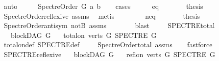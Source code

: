 \begin{isabellebody}
\ auto\isanewline
\ \ \isamarkupfalse%
\ \isamarkupfalse%
\ {\isachardoublequoteopen}Spectre{\isacharunderscore}{\kern0pt}Order\ G\ a\ b{\isachardoublequoteclose}\isanewline
\ \ \isamarkupfalse%
\ {\isacharparenleft}{\kern0pt}cases{\isacharparenright}{\kern0pt}\isanewline
\ \ \ \ \isamarkupfalse%
\ eq\isanewline
\ \ \ \ \isamarkupfalse%
\ \isamarkupfalse%
\ {\isacharquery}{\kern0pt}thesis\ \isamarkupfalse%
\ Spectre{\isacharunderscore}{\kern0pt}Order{\isacharunderscore}{\kern0pt}reflexive\ assms\ \isamarkupfalse%
\ metis\isanewline
\ \ \isamarkupfalse%
\isanewline
\ \ \ \ \isamarkupfalse%
\ neq\isanewline
\ \ \ \ \isamarkupfalse%
\ \isamarkupfalse%
\ {\isachardoublequoteopen}{\isacharquery}{\kern0pt}thesis{\isachardoublequoteclose}\ \isamarkupfalse%
\ Spectre{\isacharunderscore}{\kern0pt}Order{\isacharunderscore}{\kern0pt}antisym\ notB\ assms\isanewline
\ \ \ \ \ \ \isamarkupfalse%
\ blast\ \isanewline
\ \ \isamarkupfalse%
\isanewline
{}\isamarkupfalse%
%
\endisatagproof
{\isafoldproof}%
%
\isadelimproof
\isanewline
%
\endisadelimproof
\isanewline
{}\isamarkupfalse%
\ SPECTRE{\isacharunderscore}{\kern0pt}total{\isacharcolon}{\kern0pt}\isanewline
\ \ \ {\isachardoublequoteopen}blockDAG\ G{\isachardoublequoteclose}\isanewline
\ \ \ {\isachardoublequoteopen}total{\isacharunderscore}{\kern0pt}on\ {\isacharparenleft}{\kern0pt}verts\ G{\isacharparenright}{\kern0pt}\ {\isacharparenleft}{\kern0pt}SPECTRE\ G{\isacharparenright}{\kern0pt}{\isachardoublequoteclose}\isanewline
%
\isadelimproof
\ \ %
\endisadelimproof
%
\isatagproof
{}\isamarkupfalse%
\ total{\isacharunderscore}{\kern0pt}on{\isacharunderscore}{\kern0pt}def\ SPECTRE{\isacharunderscore}{\kern0pt}def\ \isanewline
\ \ \isamarkupfalse%
\ Spectre{\isacharunderscore}{\kern0pt}Order{\isacharunderscore}{\kern0pt}total\ assms\isanewline
\ \ \isamarkupfalse%
\ fastforce%
\endisatagproof
{\isafoldproof}%
%
\isadelimproof
\ \isanewline
%
\endisadelimproof
\isanewline
{}\isamarkupfalse%
\ SPECTRE{\isacharunderscore}{\kern0pt}reflexive{\isacharcolon}{\kern0pt}\isanewline
\ \ \ {\isachardoublequoteopen}blockDAG\ G{\isachardoublequoteclose}\isanewline
\ \ \ {\isachardoublequoteopen}refl{\isacharunderscore}{\kern0pt}on\ {\isacharparenleft}{\kern0pt}verts\ G{\isacharparenright}{\kern0pt}\ {\isacharparenleft}{\kern0pt}SPECTRE\ G{\isacharparenright}{\kern0pt}{\isachardoublequoteclose}\ \isanewline

\end{isabellebody}
